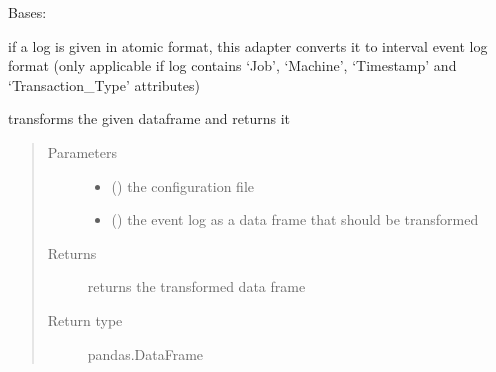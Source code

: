 \documentclass[letterpaper,10pt,english]{sphinxmanual}
\begin{document}

\begin{fulllineitems}
\label{\detokenize{event_log_analyzer:event_log_analyzer.adapter.EventToIntervalLog}}
\sphinxAtStartPar
Bases: {\hyperref[\detokenize{event_log_analyzer:event_log_analyzer.adapter.Adapter}]{}}

\sphinxAtStartPar
if a log is given in atomic format, this adapter converts it to interval event log format (only applicable if log contains ‘Job’, ‘Machine’, ‘Timestamp’ and ‘Transaction\_Type’ attributes)

\begin{fulllineitems}
\label{\detokenize{event_log_analyzer:event_log_analyzer.adapter.EventToIntervalLog.transform}}
\sphinxAtStartPar
transforms the given dataframe and returns it
\begin{quote}\begin{description}
\item[{Parameters}] \leavevmode\begin{itemize}
\item {} 
\sphinxAtStartPar
{} () \textendash{} the configuration file

\item {} 
\sphinxAtStartPar
{} () \textendash{} the event log as a data frame that should be transformed

\end{itemize}

\item[{Returns}] \leavevmode
\sphinxAtStartPar
returns the transformed data frame

\item[{Return type}] \leavevmode
\sphinxAtStartPar
pandas.DataFrame


\end{description}
\end{quote}
\end{fulllineitems}
\end{fulllineitems}
\end{document}
